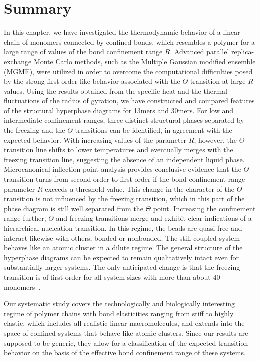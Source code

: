 \documentclass[12pt]{report}
\begin{document}
\section{Summary}
\label{sec:sum}
%
In this chapter, we have investigated the thermodynamic behavior of a linear chain of monomers connected by confined bonds, which resembles a polymer for a large range of values of the bond confinement range $R$. Advanced parallel replica-exchange Monte Carlo methods, such as the Multiple Gaussian modified ensemble (MGME), were utilized in order to overcome the computational difficulties posed by the strong first-order-like behavior associated with the $\Theta$ transition at large $R$ values. Using the results obtained from the specific heat and the thermal fluctuations of the radius of gyration, we have constructed and compared features of the structural hyperphase diagrams for 13mers and 30mers. For low and intermediate confinement ranges, three distinct structural phases separated by the freezing and the $\Theta$ transitions can be identified, in agreement with the expected behavior. With increasing values of the parameter $R$, however, the $\Theta$ transition line shifts to lower temperatures and eventually merges with the freezing transition line, suggesting the absence of an independent liquid phase. Microcanonical inflection-point analysis provides conclusive evidence that the $\Theta$ transition turns from second order to first order if the bond confinement range parameter $R$ exceeds a threshold value. This change in the character of the $\Theta$ transition is not influenced by the freezing transition, which in this part of the phase diagram is still well separated from the $\Theta$ point. Increasing the confinement range further, $\Theta$ and freezing transitions merge and exhibit clear indications of a hierarchical nucleation transition. In this regime, the beads  are quasi-free and interact likewise with others, bonded or nonbonded. The still coupled system behaves like an atomic cluster in a dilute regime. The general structure of the hyperphase diagrams can be expected to remain qualitatively intact even for substantially larger systems. The only anticipated change is that the freezing transition is of first order for all system sizes with more than about 40 monomers~\cite{Schnabel2011}.

Our systematic study covers the technologically and biologically interesting regime of polymer chains with bond elasticities ranging from stiff to highly elastic, which includes all realistic linear macromolecules,  and extends into the space of confined systems that behave like atomic clusters. Since our results are supposed to be generic, they allow for a classification of the expected transition behavior on the basis of the effective bond confinement range of these systems.
%
\end{document}
